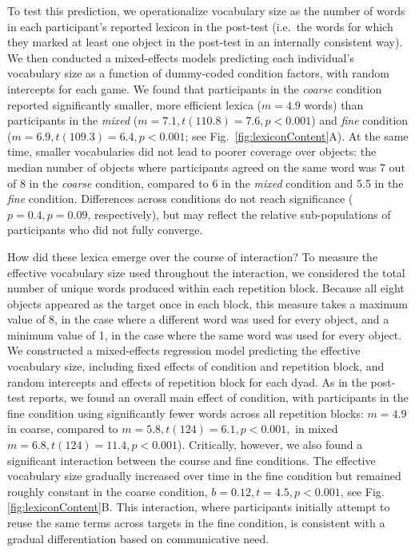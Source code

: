 To test this prediction, we operationalize vocabulary size as the number of words in each participant's reported lexicon in the post-test (i.e.\ the words for which they marked at least one object in the post-test in an internally consistent way). 
We then conducted a mixed-effects models predicting each individual's vocabulary size as a function of dummy-coded condition factors, with random intercepts for each game. 
We found that participants in the \emph{coarse} condition reported significantly smaller, more efficient lexica ($m = 4.9$ words) than participants in the \emph{mixed} ($m=7.1, t(110.8)=7.6, p < 0.001$) and \emph{fine} condition ($m = 6.9, t(109.3) = 6.4, p < 0.001$; see Fig.\ \ref{fig:lexiconContent}A). 
At the same time, smaller vocabularies did not lead to poorer coverage over objects: the median number of objects where participants agreed on the same word was 7 out of 8 in the \emph{coarse} condition, compared to 6 in the \emph{mixed} condition and 5.5 in the \emph{fine} condition. 
Differences across conditions do not reach significance ($p = 0.4, p = 0.09$, respectively), but may reflect the relative sub-populations of participants who did not fully converge. 

How did these lexica emerge over the course of interaction? 
To measure the effective vocabulary size used throughout the interaction, we considered the total number of unique words produced within each repetition block.
Because all eight objects appeared as the target once in each block, this measure takes a maximum value of 8, in the case where a different word was used for every object, and a minimum value of 1, in the case where the same word was used for every object.
We constructed a mixed-effects regression model predicting the effective vocabulary size, including fixed effects of condition and repetition block, and random intercepts and effects of repetition block for each dyad. 
As in the post-test reports, we found an overall main effect of condition, with participants in the fine condition using significantly fewer words across all repetition blocks: $m = 4.9$ in coarse, compared to $m=5.8, t(124)=6.1, p <0.001,$ in mixed $m=6.8, t(124) =11.4, p < 0.001$).
Critically, however, we also found a significant interaction between the course and fine conditions. 
The effective vocabulary size gradually increased over time in the fine condition but remained roughly constant in the coarse condition, $b = 0.12, t = 4.5, p < 0.001$, see Fig. \ref{fig:lexiconContent}B.
This interaction, where participants initially attempt to reuse the same terms across targets in the fine condition, is consistent with a gradual differentiation based on communicative need.

